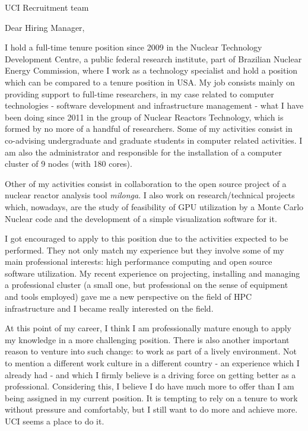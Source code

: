 \documentclass[11pt]{letter}
\begin{document}
\begin{letter}{UCI Recruitment team}

  \opening{Dear Hiring Manager,}
  
  I hold a full-time tenure position since 2009 in the Nuclear Technology Development Centre, a public federal
  research institute, part of Brazilian Nuclear Energy Commission, where I work as a technology
  specialist and hold a position which can be compared to a tenure position in USA. My job consists mainly on
  providing support to full-time researchers, in my case
  related to computer technologies - software development and infrastructure management - what I have been
  doing since 2011 in the group of Nuclear Reactors Technology, which is formed by no more of a handful of researchers.
  Some of my activities consist in co-advising undergraduate and graduate students in computer related
  activities. I am also the administrator and responsible for the installation of a
  computer cluster of 9 nodes (with 180 cores).

  Other of my activities consist in collaboration
  to the open source project of a nuclear reactor
  analysis tool \textit{milonga}. I also work on research/technical projects which, nowadays, are the study of
  feasibility of GPU utilization by a Monte Carlo Nuclear code and the development of
  a simple visualization software for it.
  
  I got encouraged to apply to this position due to the activities expected to be performed. They not only
  match my experience but they involve some of my main professional interests: high performance computing
  and open source software utilization. %
  My recent experience on projecting, installing and managing a professional
  cluster (a small one, but professional on the sense of equipment and tools employed) gave me a new perspective
  on the field of HPC infrastructure and I became really interested on the field.
  
  At this point of my career, I think I am professionally mature enough to apply my knowledge in a more
  challenging position. There is also another important reason to venture into such change: to work
  as part of a lively environment. Not to mention a different work culture in a different country - an
  experience which I already had - and which I firmly believe is a driving force on getting better as a professional.
  Considering this, I believe I do have much more to offer than I am being assigned in my current position. 
  It is tempting to rely on a tenure to work without pressure and comfortably, but I still want to do more and
  achieve more. UCI seems a place to do it.
  

\end{letter}
\end{document}
